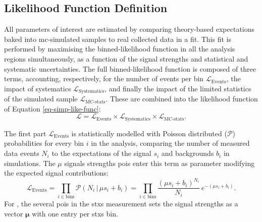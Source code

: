 \subsection{Likelihood Function Definition}\label{subsec-likelidef}
All parameters of interest are estimated by comparing theory-based expectations baked into \gls{mc}-simulated samples to real collected data in a fit. This fit is performed by maximising the binned-likelihood function in all the analysis regions simultaneously, as a function of the signal strengths and statistical and systematic uncertainties. The full binned-likelihood function is composed of three terms, accounting, respectively, for the number of events per bin $\mathcal{L}_{\text{Events}}$, the impact of systematics $\mathcal{L}_{\text{Systematics}}$, and finally the impact of the limited statistics of the simulated sample $\mathcal{L}_{\text{MC-stats}}$. These are combined into the likelihood function of Equation \ref{eq-simp-like-func}: 
\begin{equation}\label{eq-simp-like-func}
    \mathcal{L} = \mathcal{L}_{\text{Events}} \times \mathcal{L}_{\text{Systematics}} \times \mathcal{L}_{\text{MC-stats}}.
\end{equation}

The first part $\mathcal{L}_{\text{Events}}$ is statistically modelled with Poisson distributed ($\mathcal{P}$) probabilities for every bin $i$ in the analysis, comparing the number of measured data events $N_i$ to the expectations of the signal $s_i$ and backgrounds $b_i$ in simulations. The $\mu$ signals strengths \glspl{poi} enter this term as parameter modifying the expected signal contributions: \[\mathcal{L}_{\text{Events}} = \prod_{i\in \textrm{bins}} \mathcal{P}(N_i \,|\, \mu s_i + b_i) = \prod_{i\in \textrm{bins}} \frac{\left(\mu s_i + b_i\right)^{N_i}}{N_i} \, e^{-\left(\mu s_i + b_i\right)}.\] For \vhb, the several \glspl{poi} in the \gls{stxs} measurement sets the signal strengths as a vector $\boldsymbol{\mu}$ with one entry per \gls{stxs} bin.\\

